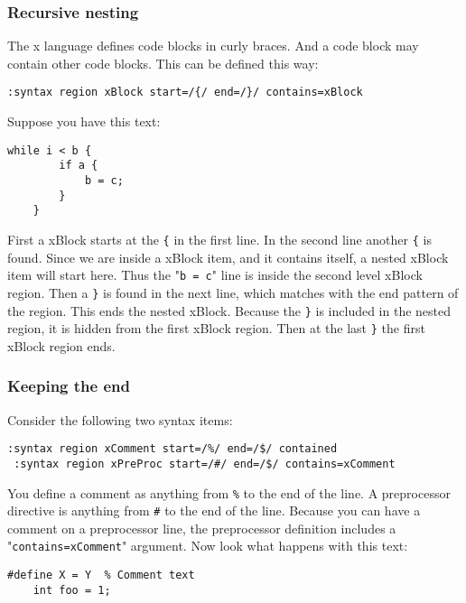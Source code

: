 \subsubsection{Recursive nesting}
The x language defines code blocks in curly braces.
And a code block may contain other code blocks.
This can be defined this way:

\begin{Verbatim}[samepage=true]
 :syntax region xBlock start=/{/ end=/}/ contains=xBlock
\end{Verbatim}

Suppose you have this text:

\begin{Verbatim}[samepage=true]
    while i < b { 
        if a { 
            b = c; 
        } 
    } 
\end{Verbatim}

First a xBlock starts at the \texttt{\{} in the first line.
In the second line another \texttt{\{} is found.
Since we are inside a xBlock item, and it contains itself, a nested xBlock item will start here.
Thus the "\texttt{b = c}" line is inside the second level xBlock region.
Then a \texttt{\}} is found in the next line, which matches with the end pattern of the region.
This ends the nested xBlock.
Because the \texttt{\}} is included in the nested region, it is hidden from the first xBlock region.
Then at the last \texttt{\}} the first xBlock region ends.

\subsubsection{Keeping the end}
Consider the following two syntax items:

\begin{Verbatim}[samepage=true]
 :syntax region xComment start=/%/ end=/$/ contained
 :syntax region xPreProc start=/#/ end=/$/ contains=xComment
\end{Verbatim}

You define a comment as anything from \texttt{\%} to the end of the line.
A preprocessor directive is anything from \texttt{\#} to the end of the line.
Because you can have a comment on a preprocessor line, the preprocessor definition includes a "\texttt{contains=xComment}" argument.
Now look what happens with this text:

\begin{Verbatim}[samepage=true]
    #define X = Y  % Comment text 
    int foo = 1; 
\end{Verbatim}


